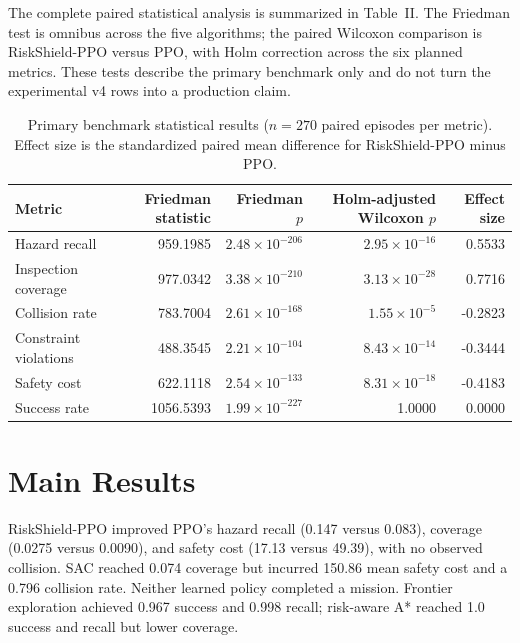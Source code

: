 \documentclass[conference]{IEEEtran}
\begin{document}
The complete paired statistical analysis is summarized in
Table~II. The Friedman test is omnibus across the five
algorithms; the paired Wilcoxon comparison is RiskShield-PPO versus PPO, with
Holm correction across the six planned metrics. These tests describe the
primary benchmark only and do not turn the experimental v4 rows into a
production claim.

\begin{table}[t]
\centering
\caption{Primary benchmark statistical results ($n=270$ paired episodes per
metric). Effect size is the standardized paired mean difference for
RiskShield-PPO minus PPO.}
\label{tab:statistics}
\scriptsize
\begin{tabular}{lrrrr}
\toprule
Metric & Friedman statistic & Friedman $p$ & Holm-adjusted Wilcoxon $p$ & Effect size\\
\midrule
Hazard recall & 959.1985 & $2.48\times10^{-206}$ & $2.95\times10^{-16}$ & 0.5533\\
Inspection coverage & 977.0342 & $3.38\times10^{-210}$ & $3.13\times10^{-28}$ & 0.7716\\
Collision rate & 783.7004 & $2.61\times10^{-168}$ & $1.55\times10^{-5}$ & -0.2823\\
Constraint violations & 488.3545 & $2.21\times10^{-104}$ & $8.43\times10^{-14}$ & -0.3444\\
Safety cost & 622.1118 & $2.54\times10^{-133}$ & $8.31\times10^{-18}$ & -0.4183\\
Success rate & 1056.5393 & $1.99\times10^{-227}$ & 1.0000 & 0.0000\\
\bottomrule
\end{tabular}
\end{table}

\section{Main Results}
\begin{table}[t]
\centering
\caption{Primary benchmark means over 270 episodes per algorithm.}
\resizebox{\textwidth}{!}{}
\end{table}

RiskShield-PPO improved PPO's hazard recall (0.147 versus 0.083), coverage
(0.0275 versus 0.0090), and safety cost (17.13 versus 49.39), with no observed
collision. SAC reached 0.074 coverage but incurred 150.86 mean safety cost and
a 0.796 collision rate. Neither learned policy completed a mission. Frontier
exploration achieved 0.967 success and 0.998 recall; risk-aware A* reached
1.0 success and recall but lower coverage.
\end{document}
